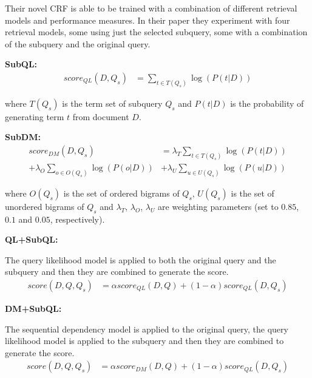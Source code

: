 \documentclass[a4paper]{report}
\begin{document}
Their novel CRF is able to be trained with a combination of different retrieval models and performance measures. In their paper they experiment with four retrieval models, some using just the selected subquery, some with a combination of the subquery and the original query.

\textbf{SubQL:}
\begin{equation}
\begin{split}
  score_{QL}(D, Q_s) &= \sum_{t \in T(Q_s)} \log(P(t|D))
\end{split}
\end{equation}

where $T(Q_s)$ is the term set of subquery $Q_s$ and $P(t|D)$ is the probability of generating term $t$ from document $D$.

\textbf{SubDM:}
\begin{equation}
\begin{split}
  score_{DM}(D, Q_s) &= \lambda_T \sum_{t \in T(Q_s)} \log(P(t|D)) \\
  + \lambda_O \sum_{o \in O(Q_s)} \log(P(o|D)) &+ \lambda_U \sum_{u \in U(Q_s)} \log(P(u|D))
\end{split}
\end{equation}

where $O(Q_s)$ is the set of ordered bigrams of $Q_s$, $U(Q_s)$ is the set of unordered bigrams of $Q_s$ and $\lambda_T$, $\lambda_O$, $\lambda_U$ are weighting parameters (set to $0.85$, $0.1$ and $0.05$, respectively).

\textbf{QL+SubQL:} 

The query likelihood model is applied to both the original query and the subquery and then they are combined to generate the score.
\begin{equation}
\begin{split}
  score(D, Q, Q_s) &= \alpha score_{QL}(D,Q) + (1-\alpha) score_{QL}(D, Q_s)
\end{split}
\end{equation}

\textbf{DM+SubQL:}

The sequential dependency model is applied to the original query, the query likelihood model is applied to the subquery and then they are combined to generate the score.
\begin{equation}
\begin{split}
  score(D, Q, Q_s) &= \alpha score_{DM}(D,Q) + (1-\alpha) score_{QL}(D, Q_s)
\end{split}
\end{equation}
\end{document}
